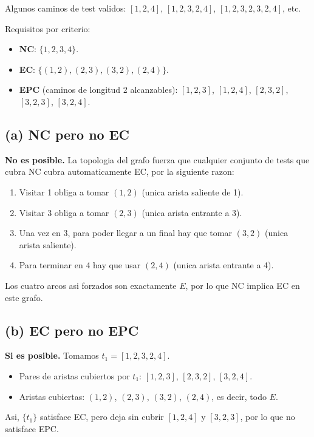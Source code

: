 \documentclass[12pt,a4paper]{article}
\begin{document}
Algunos caminos de test validos: $[1,2,4]$, $[1,2,3,2,4]$, $[1,2,3,2,3,2,4]$, etc.

Requisitos por criterio:
\begin{itemize}
  \item \textbf{NC}: $\{1, 2, 3, 4\}$.
  \item \textbf{EC}: $\{(1,2), (2,3), (3,2), (2,4)\}$.
  \item \textbf{EPC} (caminos de longitud 2 alcanzables): $[1,2,3]$, $[1,2,4]$, $[2,3,2]$,
  $[3,2,3]$, $[3,2,4]$.
\end{itemize}

\subsection{(a) NC pero no EC}

\textbf{No es posible.} La topologia del grafo fuerza que cualquier conjunto de tests que cubra
NC cubra automaticamente EC, por la siguiente razon:

\begin{enumerate}
  \item Visitar 1 obliga a tomar $(1,2)$ (unica arista saliente de 1).
  \item Visitar 3 obliga a tomar $(2,3)$ (unica arista entrante a 3).
  \item Una vez en 3, para poder llegar a un final hay que tomar $(3,2)$ (unica arista saliente).
  \item Para terminar en 4 hay que usar $(2,4)$ (unica arista entrante a 4).
\end{enumerate}

Los cuatro arcos asi forzados son exactamente $E$, por lo que NC implica EC en este grafo.

\subsection{(b) EC pero no EPC}

\textbf{Si es posible.} Tomamos $t_1 = [1, 2, 3, 2, 4]$.

\begin{itemize}
  \item Pares de aristas cubiertos por $t_1$: $[1,2,3]$, $[2,3,2]$, $[3,2,4]$.
  \item Aristas cubiertas: $(1,2)$, $(2,3)$, $(3,2)$, $(2,4)$, es decir, todo $E$.
\end{itemize}

Asi, $\{t_1\}$ satisface EC, pero deja sin cubrir $[1,2,4]$ y $[3,2,3]$, por lo que no satisface
EPC.
\end{document}
